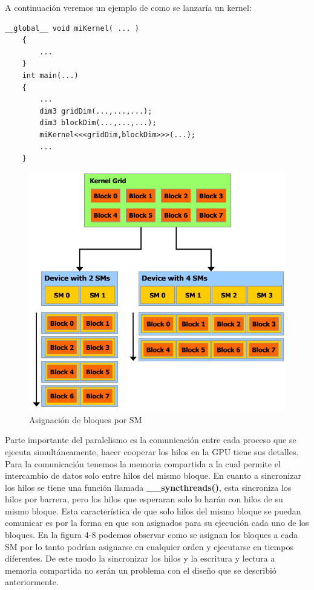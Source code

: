 A continuación veremos un ejemplo de como se lanzaría un kernel:

\begin{lstlisting}[caption=Lanzamiento de un Kernel en CUDA C.]
	__global__ void miKernel( ... )
    {
   		...
    }
	int main(...)
	{
		...	
		dim3 gridDim(...,...,...);
		dim3 blockDim(...,...,...);
		miKernel<<<gridDim,blockDim>>>(...);	
		...
	}
\end{lstlisting}

\begin{figure}[h]
			\centering
				\includegraphics[scale=0.4]{img/block_sm.png}
			\caption{Asignación de bloques por SM \cite{Flops}}
\end{figure}

\pagebreak
Parte importante del paralelismo es la comunicación entre cada proceso que se ejecuta simultáneamente, hacer cooperar los hilos en la GPU tiene sus detalles. Para la comunicación tenemos la memoria compartida a la cual permite el intercambio de datos solo entre hilos del mismo bloque. En cuanto a sincronizar los hilos se tiene una función llamada \textbf{\_\_syncthreads()}, esta sincroniza los hilos por barrera, pero los hilos que esperaran solo lo harán con hilos de su mismo bloque. Esta característica de que solo hilos del mismo bloque se puedan comunicar es por la forma en que son asignados para su ejecución cada uno de los bloques. En la figura 4-8 podemos observar como se asignan los bloques a cada SM por lo tanto podrían asignarse en cualquier orden y ejecutarse en tiempos diferentes. De este modo la sincronizar los hilos y la escritura y lectura a memoria compartida no serán un problema con el diseño que se describió anteriormente.





